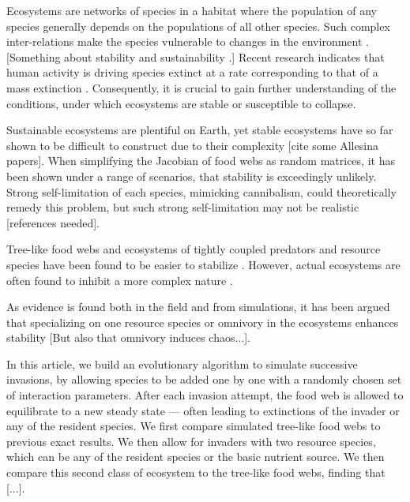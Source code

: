 Ecosystems are networks of species in a habitat where the population of any species generally depends on the populations of all other species. 
Such complex inter-relations make the species vulnerable to changes in the environment \cite{larsen2005extinction, walther2010community, loreau2013biodiversity}.
[Something about stability and sustainability \cite{loreau2013biodiversity, chapin1996principles}.]
Recent research indicates that human activity is driving species extinct at a rate corresponding to that of a mass extinction \cite{ceballos2015accelerated, barnosky2011has}. Consequently, it is crucial to gain further understanding of the conditions, under which ecosystems are stable or susceptible to collapse.

Sustainable ecosystems are plentiful on Earth, yet stable ecosystems have so far shown to be difficult to construct due to their complexity \cite{may1972will,gardner1970connectance} [cite some Allesina papers].
When simplifying the Jacobian of food webs as random matrices, it has been shown under a range of scenarios, that stability is exceedingly unlikely.
Strong self-limitation of each species, mimicking cannibalism, could theoretically remedy this problem, but such strong self-limitation may not be realistic [references needed]. 

Tree-like food webs and ecosystems of tightly coupled predators and resource species have been found to be easier to stabilize \cite{haerter2016food,allesina2012stability}. However, actual ecosystems are often found to inhibit a more complex nature \cite{hall1993food}. 

As evidence is found both in the field and from simulations, it has been argued that specializing on one resource species \cite{drossel2004impact, de1995energetics} or omnivory in the ecosystems enhances stability \cite{emmerson2004weak} [But also that omnivory induces chaos...]. 

In this article, we build an evolutionary algorithm to simulate successive invasions, by allowing species to be added one by one with a randomly chosen set of interaction parameters. 
After each invasion attempt, the food web is allowed to equilibrate to a new steady state --- often leading to extinctions of the invader or any of the resident species.
We first compare simulated tree-like food webs to previous exact results. 
We then allow for invaders with two resource species, which can be any of the resident species or the basic nutrient source. 
We then compare this second class of ecosystem to the tree-like food webs, finding that [...]. %

